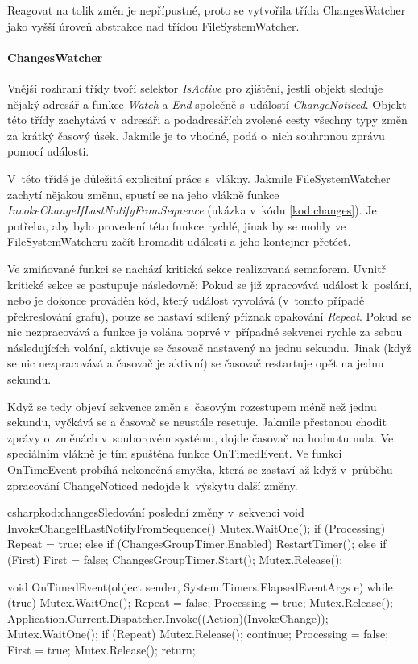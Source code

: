 \documentclass[
  biblatex,
  glossaries,
  index
]{kidiplom}
\begin{document}
Reagovat na tolik změn je nepřípustné, proto se vytvořila třída ChangesWatcher jako vyšší úroveň abstrakce nad třídou FileSystemWatcher.

\paragraph*{ChangesWatcher}
Vnější rozhraní třídy tvoří selektor {\it IsActive} pro zjištění, jestli objekt sleduje nějaký adresář a funkce {\it Watch} a {\it End} společně s~událostí {\it ChangeNoticed}. Objekt této třídy zachytává v~adresáři a podadresářích zvolené cesty všechny typy změn za krátký časový úsek. Jakmile je to vhodné, podá o~nich souhrnnou zprávu pomocí události.

V~této třídě je důležitá explicitní práce s~vlákny. Jakmile FileSystemWatcher zachytí nějakou změnu, spustí se na jeho vlákně funkce {\it InvokeChangeIfLastNotifyFromSequence} (ukázka v~kódu \ref{kod:changes}). Je potřeba, aby bylo provedení této funkce rychlé, jinak by se mohly ve FileSystemWatcheru začít hromadit události a jeho kontejner přetéct.

Ve zmiňované funkci se nachází kritická sekce realizovaná semaforem. Uvnitř kritické sekce se postupuje následovně: Pokud se již zpracovává  událost k~poslání, nebo je dokonce prováděn kód, který událost vyvolává (v~tomto případě překreslování grafu), pouze se nastaví sdílený příznak opakování {\it Repeat}. Pokud se nic nezpracovává a funkce je volána poprvé v~případné sekvenci rychle za sebou následujících volání, aktivuje se časovač nastavený na jednu sekundu. Jinak (když se nic nezpracovává a časovač je aktivní) se časovač restartuje opět na jednu sekundu.

Když se tedy objeví sekvence změn s~časovým rozestupem méně než jednu sekundu, vyčkává se a časovač se neustále resetuje. Jakmile přestanou chodit zprávy o~změnách v~souborovém systému, dojde časovač na hodnotu nula. Ve speciálním vlákně je tím spuštěna funkce OnTimedEvent.
Ve funkci OnTimeEvent probíhá nekonečná smyčka, která se zastaví až když v~průběhu zpracování ChangeNoticed nedojde k~výskytu další změny.

\begin{kicode}{csharp}{kod:changes}{Sledování poslední změny v~sekvenci}
void InvokeChangeIfLastNotifyFromSequence()
{
    Mutex.WaitOne();
    if (Processing)
        Repeat = true;
    else if (ChangesGroupTimer.Enabled)
        RestartTimer();
    else if (First)
    {
        First = false;
        ChangesGroupTimer.Start();
    }
    Mutex.Release();
}

void OnTimedEvent(object sender, System.Timers.ElapsedEventArgs e)
{
    while (true)
    {
        Mutex.WaitOne();
        Repeat = false;
        Processing = true;
        Mutex.Release();
        Application.Current.Dispatcher.Invoke((Action)(InvokeChange));
        Mutex.WaitOne();
        if (Repeat)
        {
            Mutex.Release();
            continue;
        }
        Processing = false;
        First = true;
        Mutex.Release();
        return;
    }
}
\end{kicode}
\end{document}
